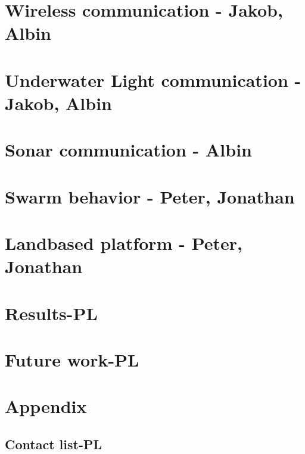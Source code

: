 \documentclass[a4paper, 10pt]{article} %
\begin{document}
\section{Wireless communication - Jakob, Albin}
\section{Underwater Light communication - Jakob, Albin}
\section{Sonar communication - Albin}
\section{Swarm behavior - Peter, Jonathan}
\section{Landbased platform - Peter, Jonathan}


\section{Results-PL}
\section{Future work-PL}
\section{Appendix}
\subsection{Contact list-PL}
\end{document}
